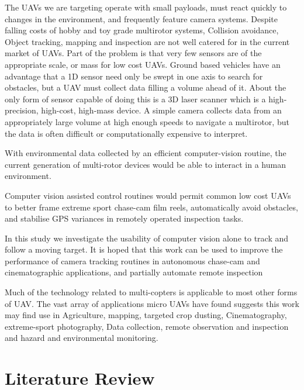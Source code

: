 \documentclass[a4paper, 11pt, titlepage]{article}
\begin{document}
      The UAVs we are targeting operate with small payloads, must react quickly to changes in the environment, and frequently feature camera systems.
      Despite falling costs of hobby and toy grade multirotor systems, Collision avoidance, Object tracking,   mapping and inspection are not well catered for in the current market of UAVs.
      Part of the problem is that very few sensors are of the appropriate scale, or mass for low cost UAVs.
      Ground based vehicles have an advantage that a 1D sensor need only be swept in one axis to search for obstacles, but a UAV must collect data filling a volume ahead of it. About the only form of sensor capable of doing this is a 3D laser scanner which is a high-precision, high-cost, high-mass device.
      A simple camera collects data from an appropriately large volume at high enough speeds to navigate a multirotor, but the data is often difficult or computationally expensive to interpret.

      With environmental data collected by an efficient computer-vision routine, the current generation of multi-rotor devices would be able to interact in a human environment.

      Computer vision assisted control routines would permit common low cost UAVs to better frame extreme sport chase-cam film reels, automatically avoid obstacles, and stabilise GPS variances in remotely operated inspection tasks.

      In this study we investigate the usability of computer vision alone to track and follow a moving target.  It is hoped that this work can be used to improve the performance of camera tracking routines in autonomous chase-cam and cinematographic applications, and partially automate remote inspection 

      Much of the technology related to multi-copters is applicable to most other forms of UAV.  The vast array of applications micro UAVs have found suggests this work may find use in Agriculture, mapping, targeted crop dusting, Cinematography, extreme-sport photography, Data collection, remote observation and inspection and hazard and environmental monitoring.

  \section{Literature Review}
\end{document}
